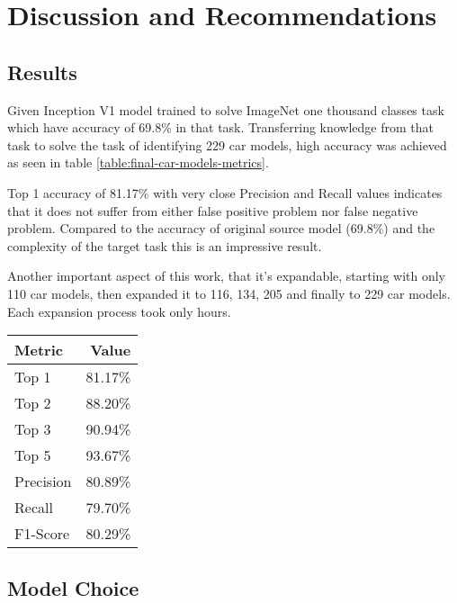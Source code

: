 \chapter{Discussion and Recommendations}

\section{Results}

Given Inception V1 model trained to solve ImageNet one thousand classes task which have accuracy of 69.8\% in that task.
Transferring knowledge from that task to solve the task of identifying 229 car models,
high accuracy was achieved as seen in table \ref{table:final-car-models-metrics}.

Top 1 accuracy of 81.17\% with very close Precision and Recall values indicates
that it does not suffer from either false positive problem nor false negative problem.
Compared to the accuracy of original source model (69.8\%)
and the complexity of the target task this is an impressive result.

Another important aspect of this work, that it's expandable, starting with only 110 car models,
then expanded it to 116, 134, 205 and finally to 229 car models.
Each expansion process took only hours.

\begin{table*}[!htbp]\caption{Final model performance for ``Car-Models-229'' Task}\label{table:final-car-models-metrics}
\centering
\begin{tabular}{lr}
\toprule
Metric            &  Value \\
\midrule
Top 1 & 81.17\% \\
Top 2 & 88.20\% \\
Top 3 & 90.94\% \\
Top 5 & 93.67\% \\
Precision & 80.89\% \\ 
Recall & 79.70\% \\
F1-Score & 80.29\% \\
\bottomrule
\end{tabular}
\end{table*}

\section{Model Choice}

